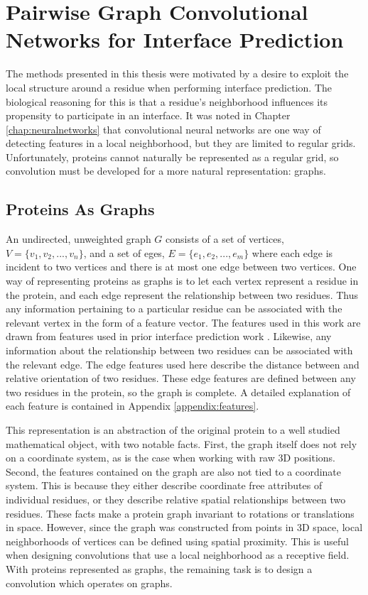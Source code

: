 \chapter{Pairwise Graph Convolutional Networks for Interface Prediction}
\label{chap:methods}

The methods presented in this thesis were motivated by a desire to exploit the local structure around a residue when performing interface prediction.
The biological reasoning for this is that a residue's neighborhood influences its propensity to participate in an interface.
It was noted in Chapter \ref{chap:neuralnetworks} that convolutional neural networks are one way of detecting features in a local neighborhood, but they are limited to regular grids. 
Unfortunately, proteins cannot naturally be represented as a regular grid, so convolution must be developed for a more natural representation: graphs.


\section{Proteins As Graphs}

An undirected, unweighted graph $G$ consists of a set of vertices, $V=\{v_1, v_2, ..., v_n\}$, and a set of eges, $E=\{e_1, e_2, ..., e_m\}$ where each edge is incident to two vertices and there is at most one edge between two vertices.
One way of representing proteins as graphs is to let each vertex represent a residue in the protein, and each edge represent the relationship between two residues.
Thus any information pertaining to a particular residue can be associated with the relevant vertex in the form of a feature vector.
The features used in this work are drawn from features used in prior interface prediction work \cite{minhas2014}.
Likewise, any information about the relationship between two residues can be associated with the relevant edge.
The edge features used here describe the distance between and relative orientation of two residues.
These edge features are defined between any two residues in the protein, so the graph is complete. 
A detailed explanation of each feature is contained in Appendix \ref{appendix:features}.

This representation is an abstraction of the original protein to a well studied mathematical object, with two notable facts.
First, the graph itself does not rely on a coordinate system, as is the case when working with raw 3D positions.
Second, the features contained on the graph are also not tied to a coordinate system.
This is because they either describe coordinate free attributes of individual residues, or they describe relative spatial relationships between two residues.
These facts make a protein graph invariant to rotations or translations in space.
However, since the graph was constructed from points in 3D space, local neighborhoods of vertices can be defined using spatial proximity.
This is useful when designing convolutions that use a local neighborhood as a receptive field.
With proteins represented as graphs, the remaining task is to design a convolution which operates on graphs. 

